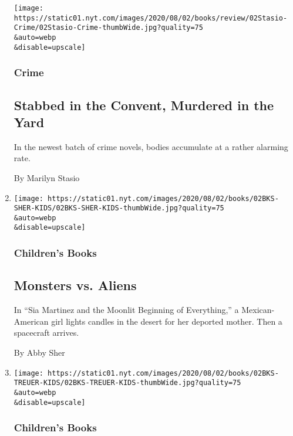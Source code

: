 \begin{enumerate}
  \texttt{[image: https://static01.nyt.com/images/2020/08/02/books/review/02Stasio-Crime/02Stasio-Crime-thumbWide.jpg?quality=75\\\&auto=webp\\\&disable=upscale]}

  \hypertarget{crime}{%
  \subsubsection{Crime}\label{crime}}

  \hypertarget{stabbed-in-the-convent-murdered-in-the-yard}{%
  \subsection{Stabbed in the Convent, Murdered in the
  Yard}\label{stabbed-in-the-convent-murdered-in-the-yard}}

  In the newest batch of crime novels, bodies accumulate at a rather
  alarming rate.

  By Marilyn Stasio
\item
  \href{/2020/07/31/books/review/sia-martinez-and-the-moonlit-beginning-of-everything-raquel-vasquez-gilliland.html}{}

  \texttt{[image: https://static01.nyt.com/images/2020/08/02/books/02BKS-SHER-KIDS/02BKS-SHER-KIDS-thumbWide.jpg?quality=75\\\&auto=webp\\\&disable=upscale]}

  \hypertarget{childrens-books-2}{%
  \subsubsection{Children's Books}\label{childrens-books-2}}

  \hypertarget{monsters-vs-aliens}{%
  \subsection{Monsters vs. Aliens}\label{monsters-vs-aliens}}

  In ``Sia Martinez and the Moonlit Beginning of Everything,'' a
  Mexican-American girl lights candles in the desert for her deported
  mother. Then a spacecraft arrives.

  By Abby Sher
\item
  \href{/2020/07/31/books/review/the-brave-james-bird.html}{}

  \texttt{[image: https://static01.nyt.com/images/2020/08/02/books/02BKS-TREUER-KIDS/02BKS-TREUER-KIDS-thumbWide.jpg?quality=75\\\&auto=webp\\\&disable=upscale]}

  \hypertarget{childrens-books-3}{%
  \subsubsection{Children's Books}\label{childrens-books-3}}


\end{enumerate}
